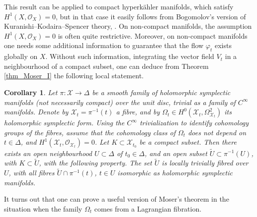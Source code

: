 \documentclass[10pt]{amsart}
\newcommand{\calo}{\mathcal{O}}
\newcommand{\XX}{\mathcal{X}}
\newtheorem{cor}[defn]{Corollary}
\begin{document}
This result can be applied to compact hyperk\"ahler manifolds,
which satisfy $H^1(X, \calo_X)=0$,
but in that case it easily follows from Bogomolov's version
of Kuranishi--Kodaira--Spencer theory, \cite{_Bogomolov:1978_}.
On non-compact manifolds, the assumption $H^1(X, \calo_X)=0$
is often quite restrictive. 
Moreover, on non-compact manifolds 
one needs some additional information to guarantee
that the flow $\varphi_t$ exists globally on $X$.
Without such information, integrating the vector field
$V_t$ in a neighbourhood of a compact subset,
one can deduce from Theorem \ref{thm_Moser_I} the following local statement.

\begin{cor}\label{cor_Moser_compact}
Let $\pi\colon \XX \to \Delta$ be
a smooth family of holomorphic
symplectic manifolds (not necessarily compact)
over the unit disc, trivial as a family of $C^\infty$ manifolds.
Denote by $\XX_t= \pi^{-1}(t)$ a fibre, and
by $\Omega_t\in H^0(\XX_t, \Omega^2_{\XX_t})$ its holomorphic
symplectic form. Using the $C^\infty$ trivialization to identify
cohomology groups of the fibres, assume that the cohomology
class of $\Omega_t$ does not depend on $t\in \Delta$,
and $H^1(\XX_t, \calo_{\XX_t})=0$. 
Let $K \subset \XX_{t_0}$ be a compact subset. Then there exists an open neighbourhood
$U\subset \Delta$  of $t_0\in \Delta$, and an open subset 
${\tilde U} \subset \pi^{-1}(U)$, with $K\subset {\tilde U}$,
with the following property. The set
${\tilde U}$ is locally trivially
fibred over $U$, with all fibres ${\tilde U} \cap \pi^{-1}(t)$,
$t\in U$ isomorphic as holomorphic symplectic
manifolds.
\end{cor}

It turns out that one can prove
a useful version of Moser's theorem in the situation when the family $\Omega_t$
comes from a Lagrangian fibration.
\end{document}
